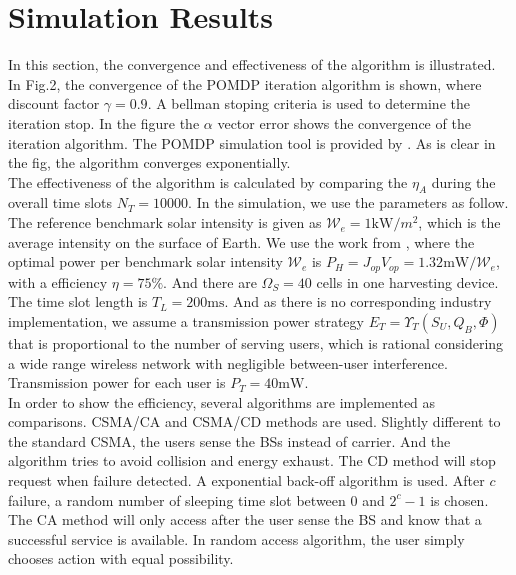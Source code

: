 \documentclass[conference]{IEEEtran}
\begin{document}
\section{Simulation Results}
In this section, the convergence and effectiveness of the algorithm is illustrated.
In Fig.2, the convergence of the POMDP iteration algorithm is shown, where discount factor \(\gamma = 0.9\).
A bellman stoping criteria is used to determine the iteration stop.
In the figure the \(\alpha\) vector error shows the convergence of the iteration algorithm.
The POMDP simulation tool is provided by \cite{pomdptool}.
As is clear in the fig, the algorithm converges exponentially.\\
\indent The effectiveness of the algorithm is calculated by comparing the \(\eta_A\)
during the overall time slots \(N_T = 10000\).
In the simulation, we use the parameters as follow.
The reference benchmark solar intensity is given as \(\mathcal{W}_e = 1\mbox{kW}/m^2\),
which is the average intensity on the surface of Earth\cite{electric}.
We use the work from \cite{circuit}, where the optimal power per benchmark solar intensity \(\mathcal{W}_e\)
is \(P_H = J_{op}V_{op} = 1.32\mbox{mW}/\mathcal{W}_e\), with a efficiency \(\eta = 75 \%\).
And there are \(\Omega_S = 40\) cells in one harvesting device.
The time slot length is \(T_L = 200\mbox{ms}\).
And as there is no corresponding industry implementation,
we assume a transmission power strategy \(E_T = \Upsilon_T(S_U, Q_B, \Phi)\)
that is proportional to the number of serving users,
which is rational considering a wide range wireless network with negligible between-user interference.
Transmission power for each user is \(P_T = 40\mbox{mW}\).\\
\indent In order to show the efficiency, several algorithms are implemented as comparisons.
CSMA/CA and CSMA/CD methods are used.
Slightly different to the standard CSMA, the users sense the BSs instead of carrier.
And the algorithm tries to avoid collision and energy exhaust.
The CD method will stop request when failure detected. A exponential back-off algorithm is used.
After \(c\) failure, a random number of sleeping time slot between \(0\) and \(2^c - 1\) is chosen.
The CA method will only access after the user sense the BS and know that a successful service is available.
In random access algorithm, the user simply chooses action with equal possibility.\\
\end{document}
